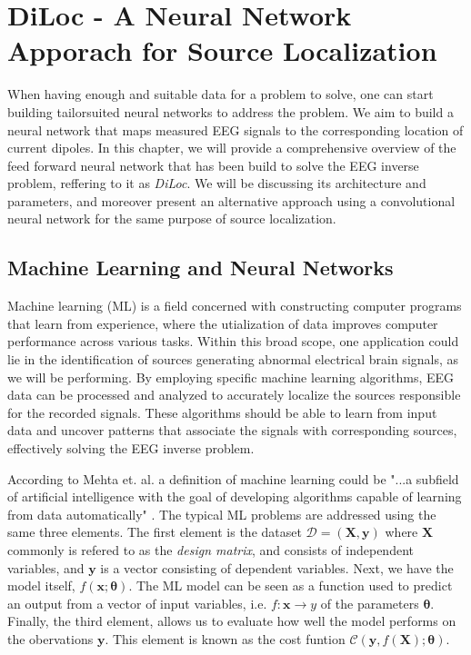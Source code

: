 \documentclass[a4paper, UKenglish, 11pt]{uiomaster}
\begin{document}
\chapter{DiLoc - A Neural Network Apporach for Source Localization}
When having enough and suitable data for a problem to solve, one can start building tailorsuited neural networks to address the problem. We aim to build a neural network that maps measured EEG signals to the corresponding location of current dipoles.
In this chapter, we will provide a comprehensive overview of the feed forward neural network that has been build to solve the EEG inverse problem, reffering to it as \emph{DiLoc}. We will be discussing its architecture and parameters, and moreover present an alternative approach using a convolutional neural network for the same purpose of source localization.



\section{Machine Learning and Neural Networks}
Machine learning (ML) is a field concerned with constructing computer programs that learn from experience, where the utialization of data improves computer performance across various tasks. Within this broad scope, one application could lie in the identification of sources generating abnormal electrical brain signals, as we will be performing. By employing specific machine learning algorithms, EEG data can be processed and analyzed to accurately localize the sources responsible for the recorded signals. These algorithms should be able to learn from input data and uncover patterns that associate the signals with corresponding sources, effectively solving the EEG inverse problem.

According to Mehta et. al. a definition of machine learning could be "...a subfield of artificial intelligence with the goal of developing algorithms capable of learning from data automatically" \cite{mehta2019high}. The typical ML problems are addressed using the same three elements. The first element is the dataset $\mathcal{D} = (\textbf{X}, \textbf{y})$ where $\textbf{X}$ commonly is refered to as the \emph{design matrix}, and consists of independent variables, and $\textbf{y}$ is a vector consisting of dependent variables. Next, we have the model itself, $f(\textbf{x}; \boldsymbol{\theta})$. The ML model can be seen as a function used to predict an output from a vector of input variables, i.e. $f : \textbf{x} \rightarrow y$ of the parameters $\boldsymbol{\theta}$. Finally, the third element, allows us to evaluate how well the model performs on the obervations $\textbf{y}$. This element is known as the cost funtion $\mathcal{C}(\textbf{y}, f(\textbf{X}); \boldsymbol{\theta})$.
\end{document}
